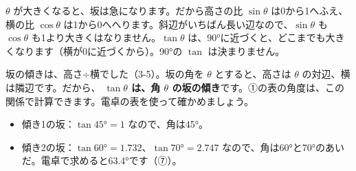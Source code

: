 \noindent\begin{minipage}[c]{0.5\linewidth}\centering
{}
\end{minipage}\hfill
\begin{minipage}[c]{0.46\linewidth}
$\theta$ が大きくなると、坂は急になります。だから高さの比 $\sin\theta$ は0から1へふえ、横の比 $\cos\theta$ は1から0へへります。斜辺がいちばん長い辺なので、$\sin\theta$ も $\cos\theta$ も1より大きくはなりません。$\tan\theta$ は、\ang{90}に近づくと、どこまでも大きくなります（横が0に近づくから）。\ang{90}の $\tan$ は決まりません。
\end{minipage}


\leavevmode\label{bk:4-6:tan}坂の傾きは、高さ÷横でした（3-5）。坂の角を $\theta$ とすると、高さは $\theta$ の対辺、横は隣辺です。だから、
\textbf{$\tan\theta$ は、角 $\theta$ の坂の傾き}です。①の表の角度は、この関係で計算できます。電卓の表を使って確かめましょう。
\begin{itemize}[leftmargin=1.2\zw, itemsep=1pt, topsep=2pt, label={\color{\bkTT}●}]
\item 傾き1の坂：$\tan\ang{45}=1$ なので、角は\ang{45}。
\item 傾き2の坂：$\tan\ang{60}=1.732$、$\tan\ang{70}=2.747$ なので、角は\ang{60}と\ang{70}のあいだ。電卓で求めると\ang{63.4}です（⑦）。
\end{itemize}


